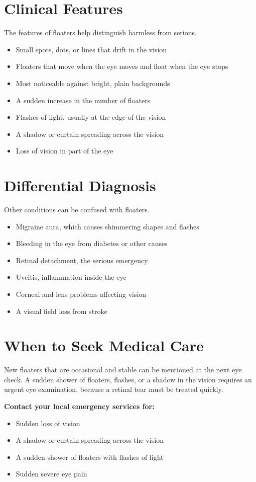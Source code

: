 \section*{Clinical Features}
The features of floaters help distinguish harmless from serious.
\begin{itemize}
    \item Small spots, dots, or lines that drift in the vision
    \item Floaters that move when the eye moves and float when the eye stops
    \item Most noticeable against bright, plain backgrounds
    \item A sudden increase in the number of floaters
    \item Flashes of light, usually at the edge of the vision
    \item A shadow or curtain spreading across the vision
    \item Loss of vision in part of the eye
\end{itemize}

\section*{Differential Diagnosis}
Other conditions can be confused with floaters.
\begin{itemize}
    \item Migraine aura, which causes shimmering shapes and flashes
    \item Bleeding in the eye from diabetes or other causes
    \item Retinal detachment, the serious emergency
    \item Uveitis, inflammation inside the eye
    \item Corneal and lens problems affecting vision
    \item A visual field loss from stroke
\end{itemize}

\section*{When to Seek Medical Care}
New floaters that are occasional and stable can be mentioned at the next eye check. A sudden shower of floaters, flashes, or a shadow in the vision requires an urgent eye examination, because a retinal tear must be treated quickly.

\textbf{Contact your local emergency services for:}
\begin{itemize}
    \item Sudden loss of vision
    \item A shadow or curtain spreading across the vision
    \item A sudden shower of floaters with flashes of light
    \item Sudden severe eye pain
\end{itemize}

